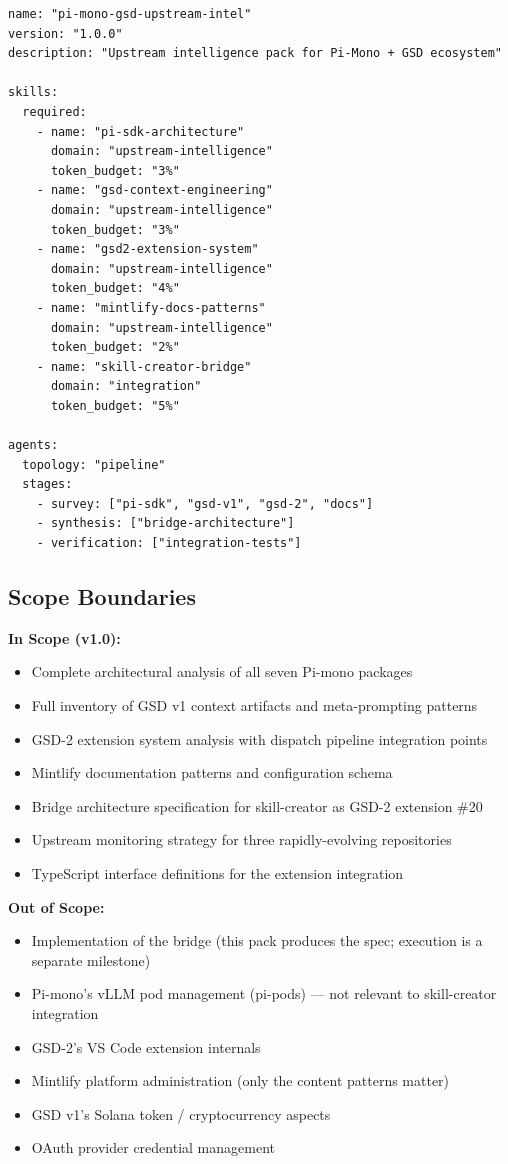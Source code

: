 \documentclass[11pt,letterpaper]{article}
\begin{document}
\begin{asciibox}
\begin{verbatim}
name: "pi-mono-gsd-upstream-intel"
version: "1.0.0"
description: "Upstream intelligence pack for Pi-Mono + GSD ecosystem"

skills:
  required:
    - name: "pi-sdk-architecture"
      domain: "upstream-intelligence"
      token_budget: "3%"
    - name: "gsd-context-engineering"
      domain: "upstream-intelligence"
      token_budget: "3%"
    - name: "gsd2-extension-system"
      domain: "upstream-intelligence"
      token_budget: "4%"
    - name: "mintlify-docs-patterns"
      domain: "upstream-intelligence"
      token_budget: "2%"
    - name: "skill-creator-bridge"
      domain: "integration"
      token_budget: "5%"

agents:
  topology: "pipeline"
  stages:
    - survey: ["pi-sdk", "gsd-v1", "gsd-2", "docs"]
    - synthesis: ["bridge-architecture"]
    - verification: ["integration-tests"]
\end{verbatim}
\end{asciibox}

\subsection{Scope Boundaries}

\textbf{In Scope (v1.0):}
\begin{itemize}[leftmargin=2em]
\item Complete architectural analysis of all seven Pi-mono packages
\item Full inventory of GSD v1 context artifacts and meta-prompting patterns
\item GSD-2 extension system analysis with dispatch pipeline integration points
\item Mintlify documentation patterns and configuration schema
\item Bridge architecture specification for skill-creator as GSD-2 extension \#20
\item Upstream monitoring strategy for three rapidly-evolving repositories
\item TypeScript interface definitions for the extension integration
\end{itemize}

\textbf{Out of Scope:}
\begin{itemize}[leftmargin=2em]
\item Implementation of the bridge (this pack produces the spec; execution is a separate milestone)
\item Pi-mono's vLLM pod management (pi-pods) --- not relevant to skill-creator integration
\item GSD-2's VS Code extension internals
\item Mintlify platform administration (only the content patterns matter)
\item GSD v1's Solana token / cryptocurrency aspects
\item OAuth provider credential management
\end{itemize}
\end{document}
